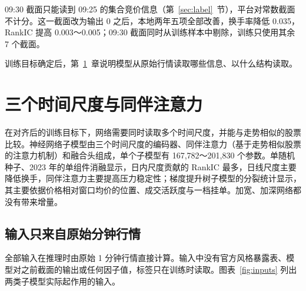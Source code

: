 \documentclass[UTF8,a4paper,zihao=-4,fontset=none]{ctexart}
\newcommand{\figref}[1]{图表~\ref{#1}}
\begin{document}
09:30 截面只能读到 09:25 的集合竞价信息（第~\ref{sec:label}~节），平台对常数截面不计分。这一截面改为输出 0 之后，本地两年五项全部改善，换手率降低 0.035，RankIC 提高 0.003～0.005；09:30 截面同时从训练样本中剔除，训练只使用其余 7 个截面。

训练目标确定后，第~\ref{sec:model}~章说明模型从原始行情读取哪些信息、以什么结构读取。

\section{三个时间尺度与同伴注意力}\label{sec:model}

在对齐后的训练目标下，网络需要同时读取多个时间尺度，并能与走势相似的股票比较。神经网络子模型由三个时间尺度的编码器、同伴注意力（基于走势相似股票的注意力机制）和融合头组成，单个子模型有 167,782～201,830 个参数。单随机种子、2023 年的单组件消融显示，日内尺度贡献的 RankIC 最多，日线尺度主要降低换手，同伴注意力主要提高压力稳定性；梯度提升树子模型的分裂统计显示，其主要依据价格相对窗口均价的位置、成交活跃度与一档挂单。加宽、加深网络都没有带来增量。

\subsection{输入只来自原始分钟行情}\label{sec:input}

全部输入在推理时由原始 1 分钟行情直接计算。输入中没有官方风格暴露表、模型对之前截面的输出或任何因子值，标签只在训练时读取。\figref{fig:inputs} 列出两类子模型实际起作用的输入。
\end{document}
